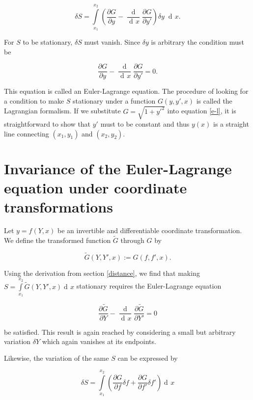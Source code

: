 \documentclass[prb,preprint]{revtex4-1}
\DeclareMathOperator{\dd}{d\!}
\DeclareMathOperator{\ddd}{\mathrm{d}}
\begin{document}
\begin{equation}
\delta S = \int\limits_{x_1}^{x_2} \left( \frac{\partial G}{\partial y}
- \frac{\ddd}{\dd x}\frac{\partial G}{\partial y'} \right) \delta y \; \dd x.
\end{equation}

For $S$ to be stationary, $\delta S$ must vanish. Since $\delta y$ is arbitrary the condition must be


\begin{equation}\label{e-l}
\frac{\partial G}{\partial y} - \frac{\ddd}{\dd x}\frac{\partial G}{\partial y'} = 0.
\end{equation}

This equation is called an Euler-Lagrange equation. The procedure of looking for a condition to make $S$ stationary under a function $G(y,y',x)$ is called the Lagrangian formalism. If we substitute $G = \sqrt{1+y'^2}$ into equation \eqref{e-l}, it is straightforward to show that $y'$ must to be constant and thus $y(x)$ is a straight line connecting $(x_1,y_1)$ and $(x_2,y_2)$.

\section{Invariance of the Euler-Lagrange equation under coordinate transformations \cite{Kleinert}}

Let $y=f(Y,x)$ be an invertible and differentiable coordinate transformation. We define the transformed function $\widetilde{G}$ through $G$ by

\begin{equation}
\widetilde{G}(Y,Y',x) := G(f,f',x).
\end{equation}

Using the derivation from section \ref{distance}, we find that making $S = \int\limits_{x_1}^{x_2} \widetilde{G}(Y,Y',x) \dd x$ stationary requires the Euler-Lagrange equation

\begin{equation}
\frac{\partial \widetilde{G}}{\partial Y}
- \frac{\ddd}{\dd x}\frac{\partial \widetilde{G}}{\partial Y'} = 0
\end{equation}

be satisfied. This result is again reached by considering a small but arbitrary variation $\delta Y$ which again vanishes at its endpoints.

Likewise, the variation of the same $S$ can be expressed by

\begin{equation}
\delta S = \int\limits_{x_1}^{x_2} \left( \frac{\partial G}{\partial f} \delta f
+ \frac{\partial G}{\partial f'} \delta f' \right) \dd x
\end{equation}
\end{document}
